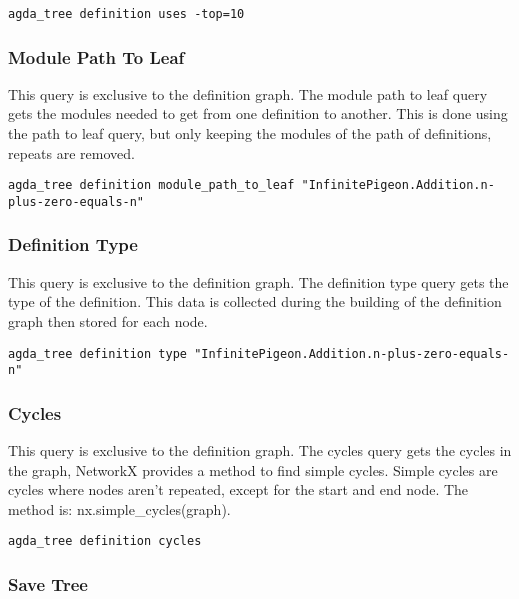 \begin{lstlisting}
agda_tree definition uses -top=10
\end{lstlisting}

\subsubsection{Module Path To Leaf}

This query is exclusive to the definition graph. The module path to leaf query
gets the modules needed to get from one definition to another. This is done
using the path to leaf query, but only keeping the modules of the path of
definitions, repeats are removed.

\begin{lstlisting}
agda_tree definition module_path_to_leaf "InfinitePigeon.Addition.n-plus-zero-equals-n"
\end{lstlisting}

\subsubsection{Definition Type}

This query is exclusive to the definition graph. The definition type query gets
the type of the definition. This data is collected during the building of the
definition graph then stored for each node.

\begin{lstlisting}
agda_tree definition type "InfinitePigeon.Addition.n-plus-zero-equals-n"
\end{lstlisting}

\subsubsection{Cycles}

This query is exclusive to the definition graph. The cycles query gets the
cycles in the graph, NetworkX provides a method to find simple cycles. Simple
cycles are cycles where nodes aren't repeated, except for the start and end
node. The method is: \textsf{nx.simple\_cycles(graph)}.

\begin{lstlisting}
agda_tree definition cycles
\end{lstlisting}

\subsubsection{Save Tree}

